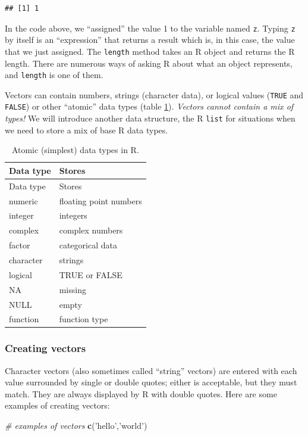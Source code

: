 \documentclass[]{article}
\newenvironment{Shaded}{\begin{snugshade}}{\end{snugshade}}
\newcommand{\KeywordTok}[1]{\textcolor[rgb]{0.13,0.29,0.53}{\textbf{#1}}}
\newcommand{\StringTok}[1]{\textcolor[rgb]{0.31,0.60,0.02}{#1}}
\newcommand{\CommentTok}[1]{\textcolor[rgb]{0.56,0.35,0.01}{\textit{#1}}}
\newcommand{\NormalTok}[1]{#1}
\theoremstyle{definition}
\theoremstyle{definition}
\theoremstyle{remark}
\begin{document}
\begin{verbatim}
## [1] 1
\end{verbatim}

In the code above, we ``assigned'' the value 1 to the variable named
\texttt{z}. Typing \texttt{z} by itself is an ``expression'' that
returns a result which is, in this case, the value that we just
assigned. The \texttt{length} method takes an R object and returns the R
length. There are numerous ways of asking R about what an object
represents, and \texttt{length} is one of them.

Vectors can contain numbers, strings (character data), or logical values
(\texttt{TRUE} and \texttt{FALSE}) or other ``atomic'' data types (table
\ref{tab:simpletypes}). \emph{Vectors cannot contain a mix of types!} We
will introduce another data structure, the R \texttt{list} for
situations when we need to store a mix of base R data types.

\begin{longtable}[]{@{}ll@{}}
\caption{\label{tab:simpletypes} Atomic (simplest) data types in
R.}\tabularnewline
\toprule
Data type & Stores\tabularnewline
\midrule
\endfirsthead
\toprule
Data type & Stores\tabularnewline
\midrule
\endhead
numeric & floating point numbers\tabularnewline
integer & integers\tabularnewline
complex & complex numbers\tabularnewline
factor & categorical data\tabularnewline
character & strings\tabularnewline
logical & TRUE or FALSE\tabularnewline
NA & missing\tabularnewline
NULL & empty\tabularnewline
function & function type\tabularnewline
\bottomrule
\end{longtable}

\subsubsection{Creating vectors}\label{creating-vectors}

Character vectors (also sometimes called ``string'' vectors) are entered
with each value surrounded by single or double quotes; either is
acceptable, but they must match. They are always displayed by R with
double quotes. Here are some examples of creating vectors:

\begin{Shaded}
\begin{Highlighting}[]
\CommentTok{# examples of vectors}
\KeywordTok{c}\NormalTok{(}\StringTok{'hello'}\NormalTok{,}\StringTok{'world'}\NormalTok{)}
\end{Highlighting}
\end{Shaded}
\end{document}
